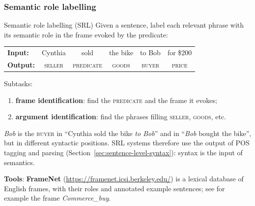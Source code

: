 \subsubsection{Semantic role labelling}

\begin{nbdef}{Semantic role labelling (SRL)}
Given a sentence, label each relevant phrase with its semantic role in the frame evoked
by the predicate:
\begin{center}
\begin{tabular}{@{}l ccccc@{}}
\textbf{Input:}  & Cynthia & sold & the bike & to Bob & for \$200 \\
\textbf{Output:} & \textsc{seller} & \textsc{predicate} & \textsc{goods} & \textsc{buyer} & \textsc{price}
\end{tabular}
\end{center}
Subtasks:
\begin{enumerate}[nosep]
  \item \textbf{frame identification}: find the \textsc{predicate} and the frame it
        evokes;
  \item \textbf{argument identification}: find the phrases filling \textsc{seller},
        \textsc{goods}, etc.
\end{enumerate}
\end{nbdef}

\begin{nbintuition}
\emph{Bob} is the \textsc{buyer} in ``Cynthia sold the bike \emph{to Bob}'' and in
``\emph{Bob} bought the bike'', but in different syntactic positions. SRL systems
therefore use the output of POS tagging and parsing
(Section~\ref{sec:sentence-level-syntax}): syntax is the input of semantics.
\end{nbintuition}

\textbf{Tools}: \textbf{FrameNet} (\url{https://framenet.icsi.berkeley.edu/}) is a
lexical database of English frames, with their roles and annotated example sentences;
see for example the frame \emph{Commerce\_buy}.
